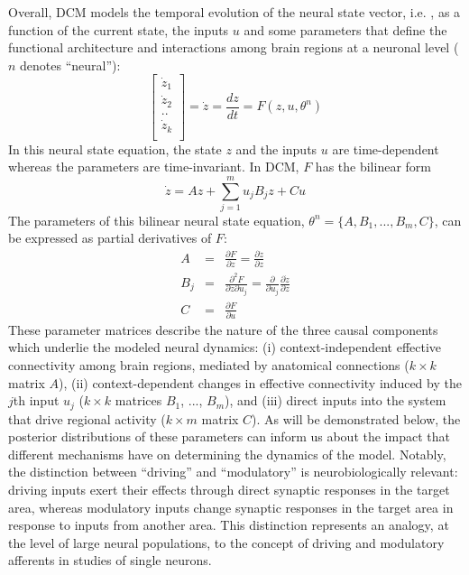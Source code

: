 Overall, DCM models the temporal evolution of the neural state vector, i.e. , as a function of the current state, the inputs $u$ and some parameters  that define the functional architecture and interactions among brain regions at a neuronal level ($n$  denotes ``neural''):
\begin{equation}
\left[ \begin{array}{l}
  \dot{z}_1 \\
  \dot{z}_2 \\
  .. \\
  \dot{z}_k \\  \end{array} \right] = \dot{z}= \frac{dz}{dt} = F(z,u,\theta^n)
\end{equation}
In this neural state equation, the state $z$ and the inputs $u$ are time-dependent whereas the parameters are time-invariant.  In DCM, $F$ has the bilinear form
 \begin{equation}
\dot{z}=Az+\sum_{j=1}^m u_j B_j z + Cu
\end{equation}
The parameters of this bilinear neural state equation, $\theta^n=\{A,B_1,...,B_m,C\}$, can be expressed as partial derivatives of $F$:
\begin{eqnarray}
A & = & \frac{\partial F}{\partial z} = \frac{\partial \dot{z}}{\partial z} \\ \nonumber
B_j & = & \frac{\partial^2 F}{\partial z \partial u_j} = \frac{\partial}{\partial u_j}\frac{\partial \dot{z}}{\partial z}  \\ \nonumber
C & = & \frac{\partial F}{\partial u}
\end{eqnarray}
These parameter matrices describe the nature of the three causal components which underlie the modeled neural dynamics:  (i) context-independent effective connectivity among brain regions, mediated by anatomical connections ($k \times k$ matrix $A$), (ii) context-dependent changes in effective connectivity induced by the $j$th input $u_j$ ($k \times k$ matrices $B_1$, ..., $B_m$), and (iii) direct inputs into the system that drive regional activity ($k \times m$ matrix $C$).  As will be demonstrated below, the posterior distributions of these parameters can inform us about the impact that different mechanisms have on determining the dynamics of the model.  Notably, the distinction between ``driving'' and ``modulatory'' is neurobiologically relevant: driving inputs exert their effects through direct synaptic responses in the target area, whereas modulatory inputs change synaptic responses in the target area in response to inputs from another area.  This distinction represents an analogy, at the level of large neural populations, to the concept of driving and modulatory afferents in studies of single neurons.

